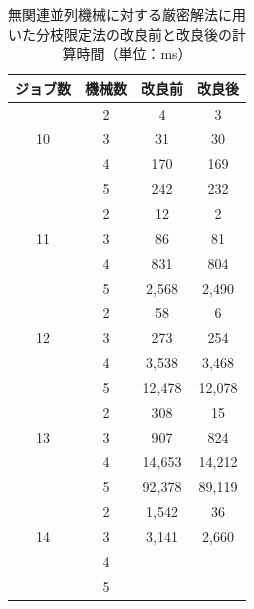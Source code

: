 \documentclass[12pt]{optlab-bachelor}
\begin{document}
\begin{table}[htb]
  \begin{center}
    \begin{tabular}{|c|c|c|c|} \hline
      ジョブ数 & 機械数 & 改良前 & 改良後 \\ \hline \hline
      & 2 & 4 & 3 \\ \cline{2-4}
      10 & 3 & 31 & 30  \\ \cline{2-4}
      & 4 & 170 & 169  \\ \cline{2-4}
      & 5 & 242 & 232 \\ \hline \hline
      & 2 & 12 & 2 \\ \cline{2-4}
      11 & 3 & 86 & 81 \\ \cline{2-4}
      & 4 & 831 & 804\\ \cline{2-4}
      & 5 & 2,568 & 2,490  \\ \hline \hline
      & 2 & 58 &  6 \\ \cline{2-4}
      12 & 3 & 273 & 254 \\ \cline{2-4}
      & 4 &  3,538 & 3,468 \\ \cline{2-4}
      & 5 & 12,478 &  12,078  \\ \hline \hline
      & 2 & 308 & 15 \\ \cline{2-4}
      13 & 3 & 907 & 824 \\ \cline{2-4}
      & 4 & 14,653 & 14,212 \\ \cline{2-4}
      & 5 & 92,378 & 89,119 \\ \hline \hline
      & 2 & 1,542 & 36 \\ \cline{2-4}
      14 & 3 & 3,141 & 2,660 \\ \cline{2-4}
      & 4 &  &  \\ \cline{2-4}
      & 5 &  &   \\ \hline \hline
    \end{tabular}
    \caption{無関連並列機械に対する厳密解法に用いた分枝限定法の改良前と改良後の計算時間（単位：ms）}
    \label{A4}
  \end{center}
\end{table}
\end{document}
